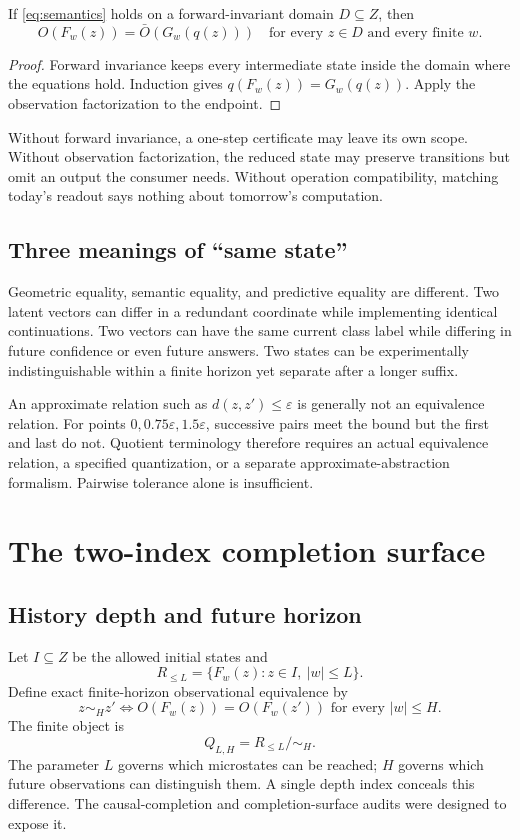 \documentclass[11pt]{article}
\begin{document}
\begin{proposition}\label{prop:continuation}
If \eqref{eq:semantics} holds on a forward-invariant domain \(D\subseteq Z\), then
\[
 O(F_w(z))=\bar O(G_w(q(z)))
 \quad\text{for every }z\in D\text{ and every finite }w.
\]
\end{proposition}
\begin{proof}
Forward invariance keeps every intermediate state inside the domain where the equations hold. Induction gives \(q(F_w(z))=G_w(q(z))\). Apply the observation factorization to the endpoint.
\end{proof}
Without forward invariance, a one-step certificate may leave its own scope. Without observation factorization, the reduced state may preserve transitions but omit an output the consumer needs. Without operation compatibility, matching today's readout says nothing about tomorrow's computation.

\subsection{Three meanings of ``same state''}
Geometric equality, semantic equality, and predictive equality are different. Two latent vectors can differ in a redundant coordinate while implementing identical continuations. Two vectors can have the same current class label while differing in future confidence or even future answers. Two states can be experimentally indistinguishable within a finite horizon yet separate after a longer suffix.

An approximate relation such as \(d(z,z')\le\varepsilon\) is generally not an equivalence relation. For points \(0,0.75\varepsilon,1.5\varepsilon\), successive pairs meet the bound but the first and last do not. Quotient terminology therefore requires an actual equivalence relation, a specified quantization, or a separate approximate-abstraction formalism. Pairwise tolerance alone is insufficient.

\section{The two-index completion surface}
\subsection{History depth and future horizon}
Let \(I\subseteq Z\) be the allowed initial states and
\[
 R_{\le L}=\{F_w(z):z\in I,\ |w|\le L\}.
\]
Define exact finite-horizon observational equivalence by
\[
 z\sim_H z'\iff O(F_w(z))=O(F_w(z'))\text{ for every }|w|\le H.
\]
The finite object is
\begin{equation}\label{eq:surface}
 Q_{L,H}=R_{\le L}/\!\sim_H.
\end{equation}
The parameter \(L\) governs which microstates can be reached; \(H\) governs which future observations can distinguish them. A single depth index conceals this difference. The causal-completion and completion-surface audits were designed to expose it. \cite{ncc,ncs}
\end{document}
